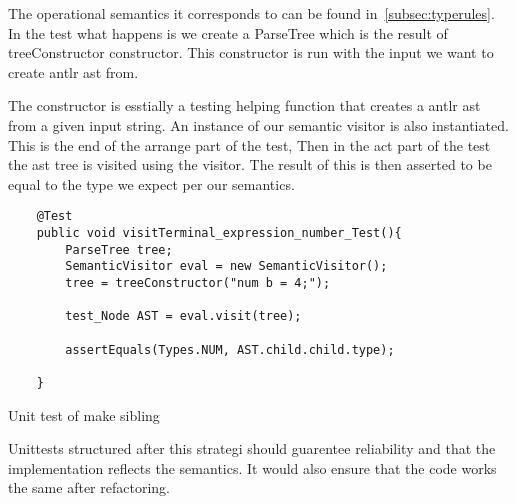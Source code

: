 The operational semantics it corresponds to can be found in~\ref{subsec:typerules}. In the test what happens is we create a ParseTree which is the result of treeConstructor constructor. This constructor is run with the input we want to create antlr ast from.

The constructor is esstially a testing helping function that creates a antlr ast from a given input string. An instance of our semantic visitor is also instantiated. This is the end of the arrange part of the test, Then in the act part of the test the ast tree is visited using the visitor. The result of this is then asserted to be equal to the type we expect per our semantics.

\begin{listing}[htb!]
    \begin{verbatim}
    @Test
    public void visitTerminal_expression_number_Test(){
        ParseTree tree;
        SemanticVisitor eval = new SemanticVisitor();
        tree = treeConstructor("num b = 4;");

        test_Node AST = eval.visit(tree);

        assertEquals(Types.NUM, AST.child.child.type);
        
    }
    \end{verbatim}
    \caption{Unit test of make sibling}
    \label{lst:Unit test of visitTerminalexpression}
\end{listing}

Unittests structured after this strategi should guarentee reliability and that the implementation reflects the semantics. It would also ensure  that the code works the same after refactoring.